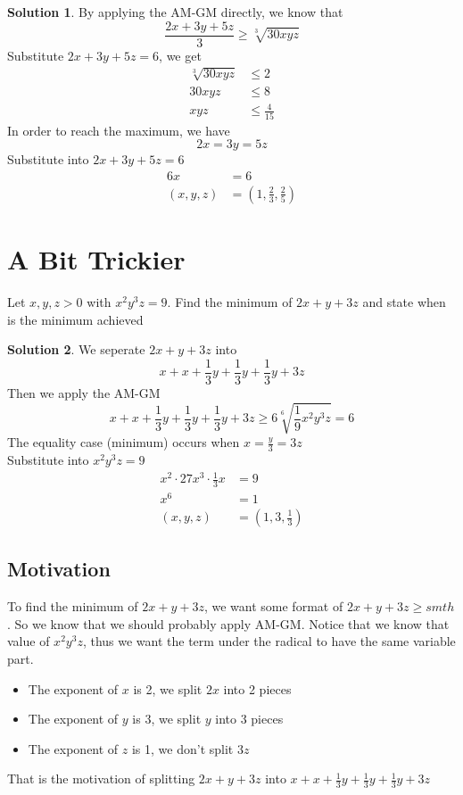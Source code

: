 \documentclass{article}
\theoremstyle{definition}
\newtheorem*{solution}{\color{blue}Solution}
\begin{document}
\begin{solution}
    By applying the AM-GM directly, we know that
    $$\frac{2x+3y+5z}{3}\ge \sqrt[3]{30xyz}$$
    Substitute $2x+3y+5z=6$, we get
    \begin{align*}
    \sqrt[3]{30xyz}&\leq 2\\
    30xyz&\leq 8\\
    xyz&\leq \boxed{\frac{4}{15}}
    \end{align*}
    In order to reach the maximum, we have
    $$2x=3y=5z$$
    Substitute into $2x+3y+5z=6$
    \begin{align*}
        6x&=6\\
        (x,y,z)&=\boxed{\left(1,\frac{2}{3},\frac{2}{5}\right)}
    \end{align*}
\end{solution}
\pagebreak



\section{A Bit Trickier}
\begin{tcolorbox}
    Let $x,y,z>0$ with $x^2y^3z=9$. Find the minimum of $2x+y+3z$ and state when is the minimum achieved
\end{tcolorbox}

\begin{solution}
    We seperate $2x+y+3z$ into $$x+x+\frac{1}{3}y+\frac{1}{3}y+\frac{1}{3}y+3z$$
    Then we apply the AM-GM
    $$x+x+\frac{1}{3}y+\frac{1}{3}y+\frac{1}{3}y+3z\ge 6\sqrt[6]{\frac{1}{9}x^2y^3z}=\boxed{6}$$
    The equality case (minimum) occurs when $x=\frac{y}{3}=3z$\\
    Substitute into $x^2y^3z=9$
    \begin{align*}
    x^2\cdot 27x^3\cdot \frac{1}{3}x&=9\\
    x^6&=1\\
    (x,y,z)&=\boxed{\left(1,3,\frac{1}{3}\right)}
    \end{align*}
\end{solution}\bigskip\bigskip

\subsection*{Motivation}
To find the minimum of $2x+y+3z$, we want some format of $2x+y+3z\ge smth$. So we know that we should probably apply AM-GM. Notice that we know that value of $x^2y^3z$, thus we want the term under the radical to have the same variable part. 
\begin{itemize}
    \item The exponent of $x$ is 2, we split $2x$ into 2 pieces
    \item The exponent of $y$ is 3, we split $y$ into 3 pieces
    \item The exponent of $z$ is 1, we don't split $3z$
\end{itemize}
That is the motivation of splitting $2x+y+3z$ into $x+x+\frac{1}{3}y+\frac{1}{3}y+\frac{1}{3}y+3z$
\pagebreak
\end{document}
